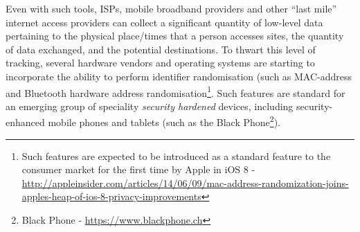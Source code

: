 \documentclass{IOS-Book-Article}     %
\newcommand{\tbox}[3][red]{{
\color{#1}\noindent{
   \fbox{\scriptsize{ {\bf #2} \textsl{#3}}}
   \vspace{2pt}
}
}}
\newcommand{\todo}[1]{\tbox{TODO:}{#1}}
\begin{document}
Even with such tools, ISPs, mobile broadband providers and other ``last mile'' internet access providers can collect a significant quantity of low-level data pertaining to the physical place/times that a person accesses sites, the quantity of data exchanged, and the potential destinations.  To thwart this level of tracking, several hardware vendors and operating systems are starting to incorporate the ability to perform identifier randomisation (such as MAC-address and Bluetooth hardware address randomisation\footnote{Such features are expected to be introduced as a standard feature to the consumer market for the first time by Apple in iOS 8 - \url{http://appleinsider.com/articles/14/06/09/mac-address-randomization-joins-apples-heap-of-ios-8-privacy-improvements}}.  Such features are standard for an emerging group of speciality \emph{security hardened} devices, including security-enhanced mobile phones and tablets (such as the Black Phone\footnote{Black Phone - \url{https://www.blackphone.ch}}). 


\end{document}
